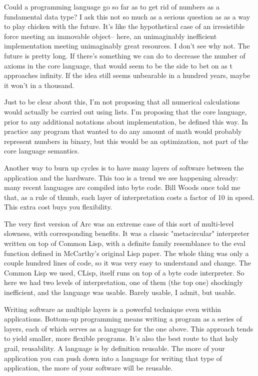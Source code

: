 Could a programming language go so far as to get rid of numbers
as a fundamental data type?  I ask this not so much as a serious
question as as a way to play chicken with the future.  It's like
the hypothetical case of an irresistible force meeting an 
immovable object-- here, an unimaginably inefficient
implementation meeting unimaginably great resources.
I don't see why not.  The future is pretty long.  If there's
something we can do to decrease the number of axioms in the core
language, that would seem to be the side to bet on as t approaches
infinity.  If the idea still seems unbearable in a hundred years,
maybe it won't in a thousand.

Just to be clear about this, I'm not proposing that all numerical
calculations would actually be carried out using lists.  I'm proposing
that the core language, prior to any additional notations about
implementation, be defined this way.  In practice any program
that wanted to do any amount of math would probably represent
numbers in binary, but this would be an optimization, not part of
the core language semantics.



Another way to burn up cycles is to have many layers of
software between the application and the hardware.  This too is
a trend we see happening already: many recent languages are
compiled into byte code.  Bill Woods once told me that,
as a rule of thumb, each layer of interpretation costs a
factor of 10 in speed.  This extra cost buys you flexibility.

The very first version of Arc was an extreme case of this sort
of multi-level slowness, with corresponding benefits.  It
was a classic "metacircular" interpreter written
on top of Common Lisp, with a definite family resemblance
to the eval function defined in McCarthy's original Lisp paper.
The whole thing was only a couple hundred lines of
code, so it was very easy to understand and change.  The 
Common Lisp we used, CLisp, itself runs on top
of a byte code interpreter.  So here we had two levels of
interpretation, one of them (the top one) shockingly inefficient,
and the language was usable.  Barely usable, I admit, but
usable.

Writing software as multiple layers is a powerful technique
even within applications.  Bottom-up programming means writing
a program as a series of layers, each of which serves as a
language for the one above.  This approach tends to yield
smaller, more flexible programs.  It's also the best route to   
that holy grail, reusability.  A language is by definition
reusable.  The more
of your application you can push down into a language for writing
that type of application, the more of your software will be 
reusable.

